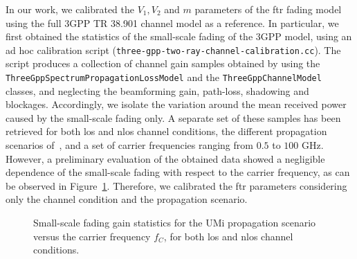 In our work, we calibrated the $V_1, V_2$ and $m$ parameters of the \gls{ftr} fading model using the full 3GPP TR 38.901 channel model as a reference. 
In particular, we first obtained the statistics of the small-scale fading of the 3GPP model, using an ad hoc calibration script (\texttt{three-\-gpp-\-two-\-ray-\-channel-\-calibration.cc}). The script produces a collection of channel gain samples obtained by using the \texttt{Three\-Gpp\-Spectrum\-Propagation\-Loss\-Model} and the \texttt{Three\-Gpp\-Channel\-Model} classes, and neglecting the beamforming gain, path-loss, shadowing and blockages. Accordingly, we isolate the variation around the mean received power caused by the small-scale fading only. 
A separate set of these samples has been retrieved for both \gls{los} and \gls{nlos} channel conditions, the different propagation scenarios of~\cite{TR38901}, and a set of carrier frequencies ranging from $0.5$ to $100$ GHz. However, a preliminary evaluation of the obtained data showed a negligible dependence of the small-scale fading with respect to the carrier frequency, as can be observed in Figure~\ref{fig:fading_vs_fc}. Therefore, we calibrated the \gls{ftr} parameters considering only the channel condition and the propagation scenario.

\begin{figure}
    \centering 
    \setlength{}
    \setlength{}
    
    \caption{Small-scale fading gain statistics for the UMi propagation scenario versus the carrier frequency $f_C$, for both \gls{los} and \gls{nlos} channel conditions.}
    \label{fig:fading_vs_fc}
\end{figure}


